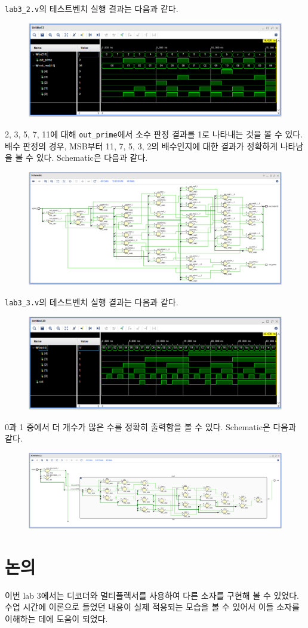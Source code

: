 \documentclass{scrartcl}
\begin{document}
\texttt{lab3\_2.v}의 테스트벤치 실행 결과는 다음과 같다.
\begin{figure}[H]
  \centering
  \includegraphics[width=\linewidth]{lab3_2_waveform}
\end{figure}
2, 3, 5, 7, 11에 대해 \texttt{out\_prime}에서 소수 판정 결과를 1로 나타내는 것을 볼 수 있다.
배수 판정의 경우, MSB부터 11, 7, 5, 3, 2의 배수인지에 대한 결과가 정확하게 나타남을 볼 수 있다.
Schematic은 다음과 같다.
\begin{figure}[H]
  \centering
  \includegraphics[width=\linewidth]{lab3_2_schematic}
\end{figure}

\texttt{lab3\_3.v}의 테스트벤치 실행 결과는 다음과 같다.
\begin{figure}[H]
  \centering
  \includegraphics[width=\linewidth]{lab3_3_waveform}
\end{figure}
0과 1 중에서 더 개수가 많은 수를 정확히 출력함을 볼 수 있다.
Schematic은 다음과 같다.
\begin{figure}[H]
  \centering
  \includegraphics[width=\linewidth]{lab3_3_schematic_expanded}
\end{figure}

\section{논의}
이번 lab 3에서는 디코더와 멀티플렉서를 사용하여 다른 소자를 구현해 볼 수 있었다.
수업 시간에 이론으로 들었던 내용이 실제 적용되는 모습을 볼 수 있어서 이들 소자를 이해하는 데에 도움이 되었다.
\end{document}
